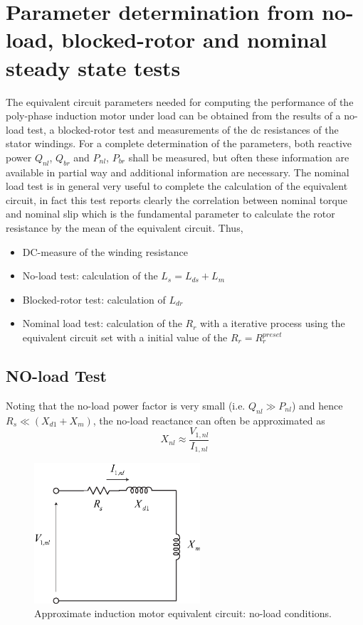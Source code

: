 \documentclass[11pt,a4paper,oneside]{book}
\numberwithin{equation}{section}
\theoremstyle{it}
\theoremstyle{definition}
\begin{document}
\section{Parameter determination from no-load, blocked-rotor and nominal steady state tests}
The equivalent circuit parameters needed for computing the performance of the poly-phase induction motor under load can be obtained from the results of a no-load test, a blocked-rotor test and measurements of the dc resistances of the stator windings. For a complete determination of the parameters, both reactive power $Q_{nl}$, $Q_{br}$ and $P_{nl}$, $P_{br}$ shall be measured, but often these information are available in partial way and additional information are necessary. The nominal load test is in general very useful to complete the calculation of the equivalent circuit, in fact this test reports clearly the correlation between nominal torque and nominal slip which is the fundamental parameter to calculate the rotor resistance by the mean of the equivalent circuit. Thus,
\begin{itemize}
	\item DC-measure of the winding resistance
	\item No-load test: calculation of the $L_s = L_{ds} + L_m$ 
	\item Blocked-rotor test: calculation of $L_{dr}$
	\item Nominal load test: calculation of the $R_r$ with a iterative process using the equivalent circuit set with a initial value of the $R_r = R_r^{preset}$
\end{itemize}

\subsection{NO-load Test}
Noting that the no-load power factor is very small (i.e. $Q_{nl} \gg P_{nl}$) and hence $R_s \ll (X_{d1}+X_m)$, the no-load reactance can often be approximated as
\begin{equation} \label{eq18}
	X_{nl} \approx \frac{V_{1,nl}}{I_{1,nl}}
\end{equation} 

\begin{figure}[htbp]
	\centering
	\includegraphics[width = 175pt, keepaspectratio]{figures/no_load_test.eps}
	\captionsetup{width=0.5\textwidth}		
	\caption{Approximate induction motor equivalent circuit: no-load conditions.}
	\label{figure:nload_circuit} 
\end{figure}
\end{document}
